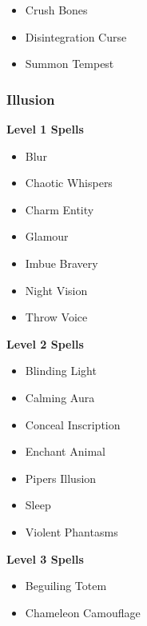 \begin{multicols}{4}
\begin{itemize}[itemsep=0em]
\item Crush Bones

\item Disintegration Curse

\item Summon Tempest


\end{itemize}
\vfill\null
\columnbreak\subsubsection{Illusion}
\textbf{Level 1 Spells}
\begin{itemize}[itemsep=0em]
\renewcommand\labelitemi{-}
\item Blur

\item Chaotic Whispers

\item Charm Entity

\item Glamour

\item Imbue Bravery

\item Night Vision

\item Throw Voice


\end{itemize}
\textbf{Level 2 Spells}
\begin{itemize}[itemsep=0em]
\renewcommand\labelitemi{-}
\item Blinding Light

\item Calming Aura

\item Conceal Inscription

\item Enchant Animal

\item Piper{\apos}s Illusion

\item Sleep

\item Violent Phantasms


\end{itemize}
\textbf{Level 3 Spells}
\begin{itemize}[itemsep=0em]
\renewcommand\labelitemi{-}
\item Beguiling Totem

\item Chameleon\apos{} Camouflage


\end{itemize}
\end{multicols}
